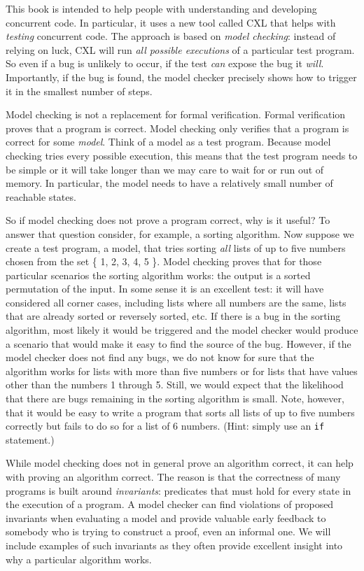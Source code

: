 \documentclass{report}
\begin{document}
This book is intended to help people with understanding and
developing concurrent code.  In particular, it uses a new tool
called CXL that helps with \emph{testing} concurrent code.
The approach is based on \emph{model checking}:
instead of relying
on luck, CXL will run \emph{all possible executions} of a particular
test program.  So even if a bug is unlikely to occur, if the test
\emph{can} expose the bug it \emph{will}.  Importantly, if the bug is
found, the model checker precisely shows how to trigger it in
the smallest number of steps.

Model checking is not a replacement for formal verification.
Formal verification proves that a program is correct.  Model checking only
verifies that a program is correct for some \emph{model}.  Think of
a model as a test program.  Because model checking tries every possible
execution, this means that the test program needs to be
simple or it will take longer than we may care to wait for or run
out of memory.
In particular, the model needs to have a relatively small number of
reachable states.

So if model checking does not prove a program correct, why is it
useful?  To answer that question consider, for example, a sorting
algorithm.
Now suppose we create a test program, a model, that tries sorting
\emph{all} lists of up to five numbers chosen from the set \{ 1,
2, 3, 4, 5 \}.  Model checking proves that for those particular
scenarios the sorting algorithm works: the output is a sorted
permutation of the input.  In some sense it is an excellent test:
it will have considered all corner cases, including lists where all
numbers are the same, lists that are already sorted or reversely
sorted, etc.  If there is a bug in the sorting algorithm, most
likely it would be triggered and the model checker would produce a
scenario that would make it easy to find the source of the bug.
However, if the model checker does not find any bugs, we do not
know for sure that the algorithm works for lists with more than
five numbers or for lists that have values other than the numbers
1 through 5.  Still, we would expect that the likelihood that there
are bugs remaining in the sorting algorithm is small.
Note, however, that it would be easy to write a program
that sorts all lists of up to five numbers correctly but fails to
do so for a list of 6 numbers.  (Hint: simply use an \texttt{if}
statement.)

While model checking does not in general prove an algorithm correct,
it can help with proving an algorithm correct.
The reason is that the correctness of many programs is built around
\emph{invariants}:
predicates that must hold for every state in the
execution of a program.  A model checker can find violations of
proposed invariants when evaluating a model and provide valuable early
feedback to somebody who is trying to construct a proof, even an
informal one.
We will include examples
of such invariants as they often provide excellent insight into
why a particular algorithm works.
\end{document}
